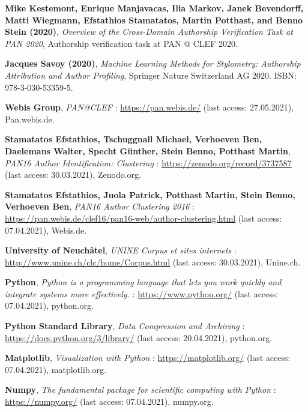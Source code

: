 \begin{thebibliography}{9}
\textbf{Mike Kestemont, Enrique Manjavacas, Ilia Markov, Janek Bevendorff, Matti Wiegmann, Efstathios Stamatatos, Martin Potthast, and Benno Stein (2020)},
\textit{Overview of the Cross-Domain Authorship Verification Task at PAN 2020},
Authorship verification task at PAN @ CLEF 2020.

\textbf{Jacques Savoy (2020)},
\textit{Machine Learning Methods for Stylometry: Authorship Attribution and Author Profiling},
Springer Nature Switzerland AG 2020. ISBN: 978-3-030-53359-5.


\textbf{Webis Group},
\textit{PAN@CLEF} : \url{https://pan.webis.de/} (last access: 27.05.2021),
Pan.webis.de.

\textbf{Stamatatos Efstathios, Tschuggnall Michael, Verhoeven Ben, Daelemans Walter, Specht Günther, Stein Benno, Potthast Martin},
\textit{PAN16 Author Identification: Clustering} : \url{https://zenodo.org/record/3737587} (last access: 30.03.2021),
Zenodo.org.

\textbf{Stamatatos Efstathios, Juola Patrick, Potthast Martin, Stein Benno, Verhoeven Ben},
\textit{PAN16 Author Clustering 2016} : \url{https://pan.webis.de/clef16/pan16-web/author-clustering.html} (last access: 07.04.2021),
Webis.de.

\textbf{University of Neuchâtel},
\textit{UNINE Corpus et sites internets} : \url{http://www.unine.ch/clc/home/Corpus.html} (last access: 30.03.2021),
Unine.ch.


\textbf{Python},
\textit{Python is a programming language that lets you work quickly and integrate systems more effectively.} : \url{https://www.python.org/} (last access: 07.04.2021),
python.org.

\textbf{Python Standard Library},
\textit{Data Compression and Archiving} : \url{https://docs.python.org/3/library/} (last access: 20.04.2021),
python.org.

\textbf{Matplotlib},
\textit{Visualization with Python} : \url{https://matplotlib.org/} (last access: 07.04.2021),
matplotlib.org.

\textbf{Numpy},
\textit{The fundamental package for scientific computing with Python} : \url{https://numpy.org/} (last access: 07.04.2021),
numpy.org.


\end{thebibliography}
